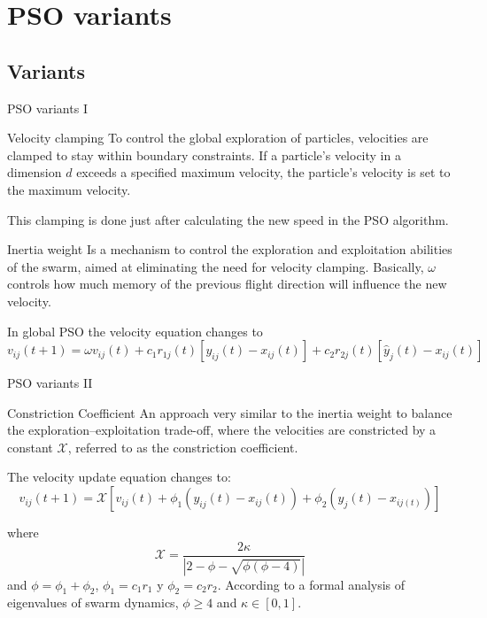 \documentclass[aspectratio=169,compress,10pt]{beamer}
\begin{document}
\section{PSO variants}
\subsection{Variants}

\begin{frame}{PSO variants I}
\begin{block}{Velocity clamping}
To control the global exploration of particles, velocities
are clamped to stay within boundary constraints.
If a particle’s velocity in a dimension $d$ exceeds
a specified maximum velocity, the particle’s velocity is set to the maximum velocity.

This clamping is done just after calculating the new speed in the PSO algorithm.
\end{block}
    
\begin{block}{Inertia weight}
Is a mechanism to control the exploration and exploitation abilities of the swarm, aimed at eliminating the need for velocity clamping.
Basically, $\omega$ controls how much memory of the previous flight direction will influence the new velocity.

In global PSO the velocity equation changes to
\begin{equation}
	v_{ij}(t+1) = \omega v_{ij}(t) + c_1r_{1j}(t)[y_{ij}(t) - x_{ij}(t)] + c_2 r_{2j}(t)[\hat{y}_j(t) - x_{ij}(t)]
	\label{eq:velocidad-peso-inercia}
\end{equation}
\end{block}

\end{frame}


\begin{frame}{PSO variants II}
\begin{block}{Constriction Coefficient}
An approach very similar to the inertia weight to balance the
exploration–exploitation trade-off, where the velocities are constricted by a constant $\mathcal{X}$, referred to as the constriction coefficient.

The velocity update equation changes to:
\begin{equation}
	v_{ij}(t+1) = \mathcal{X} [ v_{ij}(t) + \phi_1 (y_{ij}(t) - x_{ij}(t)) + \phi_2(\hat{y}_j(t) - x_{ij(t)})   ]
\end{equation}

where
$$
\mathcal{X} = \frac{2 \kappa}{| 2 - \phi - \sqrt{\phi ( \phi - 4)}  |}
$$
and $\phi = \phi_1 + \phi_2$, $\phi_1 = c_1 r_1$ y $\phi_2 = c_2 r_2$.
According to a formal analysis of eigenvalues of swarm dynamics,  $\phi \geq 4$ and $\kappa \in [0,1]$.
\end{block}
\end{frame}
\end{document}
